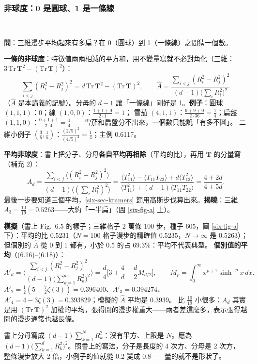 \subsubsection{非球度：0 是圓球、1 是一條線}
\leavevmode{}\ \par\nopagebreak

\textbf{問}：三維漫步平均起來有多扁？在 0（圓球）到 1（一條線）之間猜一個數。

\textbf{一條的非球度}：特徵值兩兩相減的平方和，用不變量寫就不必對角化（三維：$3\,\mathrm{Tr}\,\mathbf T^2-(\mathrm{Tr}\,\mathbf T)^2$）：
\[\sum_{i<j}(R_i^2-R_j^2)^2=d\,\mathrm{Tr}\,\mathbf T^2-(\mathrm{Tr}\,\mathbf T)^2,\qquad
\hat A=\frac{\sum_{i<j}(R_i^2-R_j^2)^2}{(d-1)\big(\sum_iR_i^2\big)^2}\tag{6.10, 6.13}\]
（$\hat A$ 是本講義的記號）。分母的 $d-1$ 讓「一條線」剛好是 1。\textbf{例子}：圓球 $(1,1,1)$：0；線 $(1,0,0)$：$\frac{1+1+0}{2\cdot1}=1$；
雪茄 $(4,1,1)$：$\frac{9+9+0}{2\cdot36}=\frac14$；扁盤 $(1,1,0)$：$\frac{0+1+1}{2\cdot4}=\frac14$——雪茄和扁盤分不出來，一個數只能說「有多不圓」。
二維小例子 $(\frac35,\frac15)$：$\frac{(2/5)^2}{(4/5)^2}=\frac14$；主例 0.6117。

\textbf{平均非球度}：書上把分子、分母\textbf{各自平均再相除}（平均的比），再用 $\mathbf T$ 的分量寫（補充 2）：
\[A_d=\frac{\sum_{i<j}\langle(R_i^2-R_j^2)^2\rangle}{(d-1)\big\langle(\sum_iR_i^2)^2\big\rangle}
=\frac{\langle T_{11}^2\rangle-\langle T_{11}T_{22}\rangle+d\langle T_{12}^2\rangle}{\langle T_{11}^2\rangle+(d-1)\langle T_{11}T_{22}\rangle}
=\frac{4+2d}{4+5d}.\tag{6.12, 6.14, 6.15}\]
最後一步要知道三個平均，\ref{six-sec-kramers} 節用高斯步伐算出來。\textbf{揭曉}：三維 $A_3=\frac{10}{19}=0.5263$——大約「一半扁」（圖 \ref{six-fig-a} 上）。

\textbf{模擬}（書上 Fig.~6.5 的樣子；三維格子 2 萬條 100 步，種子 605，圖 \ref{six-fig-a} 下）：平均的比 0.5231（$N=100$ 格子漫步的精確值 0.5235，$N\to\infty$ 是 0.5263）；
但個別的 $\hat A$ 從 0 到 1 都有，小於 0.5 的占 69.3\%：平均不代表典型。
\textbf{個別值的平均}（(6.16)--(6.18)）：
\[A'_d=\Big\langle\frac{\sum_{i<j}(R_i^2-R_j^2)^2}{(d-1)\big(\sum_{k=1}^{d}R_k^2\big)^2}\Big\rangle=\frac d4\Big[3+\frac4d-\frac d2M_{d/2}\Big],\qquad M_p=\int_0^\infty x^{p+1}\sinh^{-p}x\,dx .\]
$A'_2=\frac12(5-\frac72\zeta(3))=0.396400$、$A'_3=0.394274$、$A'_4=4-3\zeta(3)=0.393829$；模擬的 $\hat A$ 平均是 0.3939。
比 $\frac{10}{19}$ 小很多：$A_d$ 其實是用 $(\mathrm{Tr}\,\mathbf T)^2$ 加權的平均，張得開的漫步權重大——兩者差這麼多，表示張得越開的漫步通常也越長條。
\begin{errbox}[p.~135，(6.16)]
書上分母寫成 $(d-1)\sum_{k=1}^{N}R_k^2$：沒有平方、上限是 $N$。應為 $(d-1)\big(\sum_{k=1}^{d}R_k^2\big)^2$。照書上的寫法，分子是長度的 4 次方、分母是 2 次方，
整條漫步放大 2 倍，小例子的值就從 0.2 變成 0.8——量的就不是形狀了。
\end{errbox}

